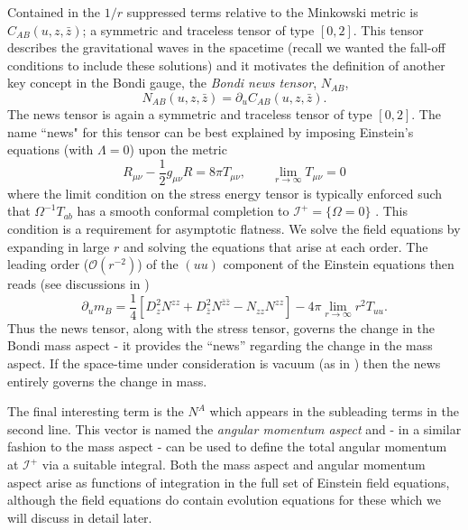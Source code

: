 \documentclass[a4paper,11pt]{article}
\numberwithin{equation}{section}
\begin{document}
Contained in the $1/r$ suppressed terms relative to the Minkowski metric is $C_{AB}(u,z,\bar{z})$; a symmetric and traceless tensor of type $[0,2]$. This tensor describes the gravitational waves in the spacetime (recall we wanted the fall-off conditions to include these solutions) and it motivates the definition of another key concept in the Bondi gauge, the \textit{Bondi news tensor}, $N_{AB}$, 
\begin{equation}
N_{AB}(u,z,\bar{z})=\partial_{u}C_{AB}(u,z,\bar{z}).
\end{equation}
The news tensor is again a symmetric and traceless tensor of type $[0,2]$. The name ``news" for this tensor can be best explained by imposing Einstein's equations (with $\Lambda=0$) upon the metric 
\begin{equation}
R_{\mu \nu}-\frac{1}{2}g_{\mu \nu}R=8\pi T_{\mu \nu}, \qquad \lim_{r \rightarrow \infty} T_{\mu \nu} =0
\end{equation}
where the limit condition on the stress energy tensor is typically enforced such that $\Omega^{-1} T_{ab}$ has a smooth conformal completion to $\mathscr{I^+}= \{\Omega = 0\}$ \cite{Ashtekar:2014zfa}. This condition is a requirement for asymptotic flatness. We solve the field equations by expanding in large $r$ and solving the equations that arise at each order. The leading order ($\mathcal{O}(r^{-2})$) of the $(uu)$ component of the Einstein equations then reads (see discussions in \cite{Strominger:2017zoo,Flanagan:2015pxa}) 
\begin{equation}
\partial_u m_B=\frac{1}{4}[D^2_zN^{zz}+D^2_{\bar{z}}N^{\bar{z}\bar{z}}-N_{zz}N^{zz}]-4\pi  \lim_{r\rightarrow \infty} r^2T_{uu}.
\end{equation}
Thus the news tensor, along with the stress tensor, governs the change in the Bondi mass aspect - it provides the ``news'' regarding the change in the mass aspect. If the space-time under consideration is vacuum (as in \cite{Bondi:1962px}) then the news entirely governs the change in mass.

The final interesting term is the $N^A$ which appears in the subleading terms in the second line. This vector is named the \textit{angular momentum aspect} and - in a similar fashion to the mass aspect - can be used to define the total angular momentum at $\mathscr{I^+}$ via a suitable integral. Both the mass aspect and angular momentum aspect arise as functions of integration in the full set of Einstein field equations, although the field equations do contain evolution equations for these \cite{Flanagan:2015pxa, Strominger:2013jfa, Pasterski:2015tva, Barnich:2010eb} which we will discuss in detail later.
\end{document}
